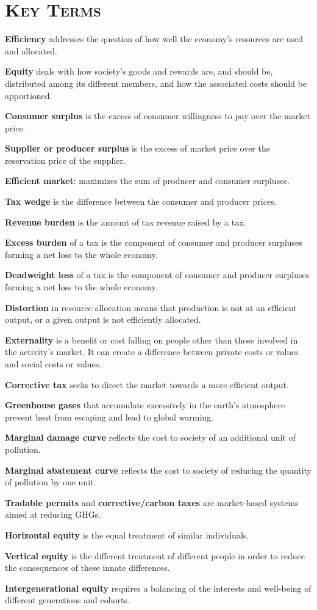 \newpage
{}
	\section*{\textsc{Key Terms}}
\begin{keyterms}
\textbf{Efficiency} addresses the question of how well the economy's resources are used and allocated.

\textbf{Equity} deals with how society's goods and rewards are, and should be, distributed among its different members, and how the associated costs should be apportioned.

\textbf{Consumer surplus} is the excess of consumer willingness to pay over the market price.

\textbf{Supplier or producer surplus} is the excess of market price over the reservation price of the supplier.

\textbf{Efficient market}: maximizes the sum of producer and consumer surpluses.

\textbf{Tax wedge} is the difference between the consumer and producer prices.

\textbf{Revenue burden} is the amount of tax revenue raised by a tax.

\textbf{Excess burden} of a tax is the component of consumer and producer surpluses forming a net loss to the whole economy.

\textbf{Deadweight loss} of a tax is the component of consumer and producer surpluses forming a net loss to the whole economy.

\textbf{Distortion} in resource allocation means that production is not at an efficient output, or a given output is not efficiently allocated.

\textbf{Externality} is a benefit or cost falling on people other than those involved in the activity's market. It can create a difference between private costs or values and social costs or values.

\textbf{Corrective tax} seeks to direct the market towards a more efficient output.

\textbf{Greenhouse gases} that accumulate excessively in the earth's atmosphere prevent heat from escaping and lead to global warming.

\textbf{Marginal damage curve} reflects the cost to society of an additional unit of pollution.

\textbf{Marginal abatement curve} reflects the cost to society of reducing the quantity of pollution by one unit.

\textbf{Tradable permits} and \textbf{corrective/carbon taxes} are market-based systems aimed at reducing GHGs.

\textbf{Horizontal equity} is the equal treatment of similar individuals.

\textbf{Vertical equity} is the different treatment of different people in order to reduce the consequences of these innate differences.

\textbf{Intergenerational equity} requires a balancing of the interests and well-being of different generations and cohorts.
\end{keyterms}